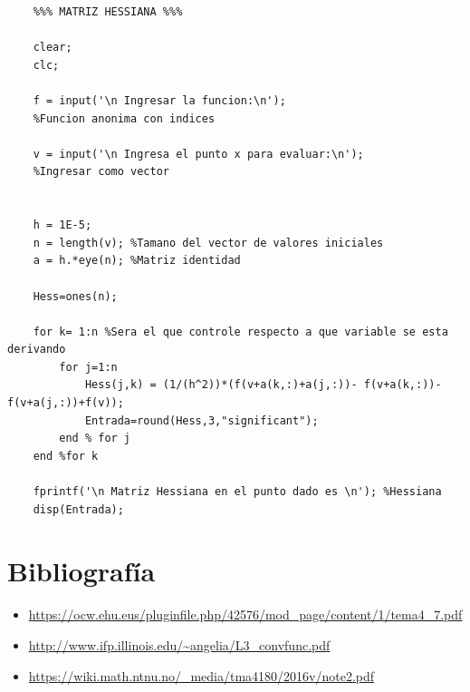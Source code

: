 \documentclass[12pt]{article}
\begin{document}
\begin{lstlisting}
    %%% MATRIZ HESSIANA %%%

    clear;
    clc;
    
    f = input('\n Ingresar la funcion:\n');
    %Funcion anonima con indices
    
    v = input('\n Ingresa el punto x para evaluar:\n');
    %Ingresar como vector
    
    
    h = 1E-5;
    n = length(v); %Tamano del vector de valores iniciales
    a = h.*eye(n); %Matriz identidad  

    Hess=ones(n);

    for k= 1:n %Sera el que controle respecto a que variable se esta derivando
        for j=1:n
            Hess(j,k) = (1/(h^2))*(f(v+a(k,:)+a(j,:))- f(v+a(k,:))- f(v+a(j,:))+f(v));
            Entrada=round(Hess,3,"significant");
        end % for j
    end %for k

    fprintf('\n Matriz Hessiana en el punto dado es \n'); %Hessiana
    disp(Entrada);
\end{lstlisting}

\section*{Bibliografía}

\begin{itemize}
    \item \url{https://ocw.ehu.eus/pluginfile.php/42576/mod_page/content/1/tema4_7.pdf}
    \item \url{http://www.ifp.illinois.edu/~angelia/L3_convfunc.pdf}
    \item \url{https://wiki.math.ntnu.no/_media/tma4180/2016v/note2.pdf}
\end{itemize}



\end{document}
